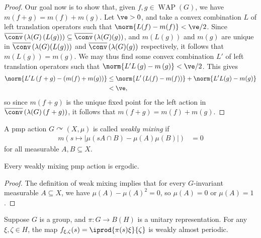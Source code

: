 \documentclass[10pt]{mypackage}
\begin{document}
\begin{proof}
  Our goal now is to show that, given $f,g\in \operatorname{WAP}\left( G \right)$, we have $m\left( f + g \right) = m\left( f \right) + m\left( g \right)$. Let $\ve > 0$, and take a convex combination $L$ of left translation operators such that $\norm{L(f) - m(f)} < \ve/2$. Since $ \overline{\conv}\left( \lambda(G)\left( L(g) \right) \right) \subseteq \overline{\conv}\left( \lambda(G)(g) \right) $, and $m\left( L(g) \right)$ and $m\left( g \right)$ are unique in $ \overline{\conv}\left( \lambda(G)(L(g)) \right) $ and $ \overline{\conv}\left( \lambda(G)(g) \right) $ respectively, it follows that $m\left( L(g) \right) = m\left( g \right)$. We may thus find some convex combination $L'$ of left translation operators such that $\norm{L'L\left( g \right) - m\left( g \right)} < \ve/2$. This gives
  \begin{align*}
    \norm{L'L\left( f+g \right) - \left( m(f) + m(g) \right)} &\leq \norm{L' \left( L(f)-m(f) \right)} + \norm{L'L(g)-m(g)}\\
                                                              &< \ve,
  \end{align*}
  so since $m\left( f + g \right)$ is the unique fixed point for the left action in $ \overline{\conv}\left( \lambda(G)\left( f+g \right) \right) $, it follows that $m\left( f + g \right) = m\left( f \right) + m\left( g \right)$.
\end{proof}
\begin{definition}
  A pmp action $G\curvearrowright \left( X,\mu \right)$ is called \textit{weakly mixing} if
  \begin{align*}
    m\left( s\mapsto \left\vert \mu\left( sA\cap B \right) - \mu\left( A \right)\mu\left( B \right) \right\vert \right) &= 0
  \end{align*}
  for all measurable $A,B\subseteq X$. 
\end{definition}
\begin{proposition}
  Every weakly mixing pmp action is ergodic.
\end{proposition}
\begin{proof}
  The definition of weak mixing implies that for every $G$-invariant measurable $A\subseteq X$, we have $\mu\left( A \right)-\mu\left( A \right)^2 = 0$, so $\mu\left( A  \right) = 0$ or $\mu\left( A \right) = 1$.
\end{proof}
Suppose $G$ is a group, and $\pi\colon G\rightarrow B\left( H \right)$ is a unitary representation. For any $\xi,\zeta\in H$, the map $f_{\xi,\zeta}(s) = \iprod{\pi(s)\xi}{\zeta}$ is weakly almost periodic.
\end{document}
